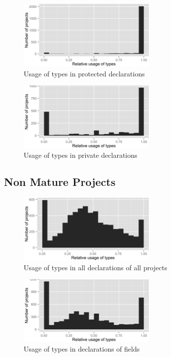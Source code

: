 \begin{figure}[h]
\centering 
\includegraphics[width=0.6\textwidth]{../aosd_2014/analysis/result/script/class/histograms/12_Protected.png} 
\caption{Usage of types in protected declarations}
\end{figure}

\begin{figure}[h]
\centering 
\includegraphics[width=0.6\textwidth]{../aosd_2014/analysis/result/script/class/histograms/11_Private.png} 
\caption{Usage of types in private declarations}
\end{figure}


\FloatBarrier
\subsection*{Non Mature Projects}

\begin{figure}[h]
\centering 
\includegraphics[width=0.6\textwidth]{../aosd_2014/analysis/result/script/class/histograms/5_all_types.png} 
\caption{Usage of types in all declarations of all projects}
\end{figure}

\begin{figure}[h]
\centering 
\includegraphics[width=0.6\textwidth]{../aosd_2014/analysis/result/script/class/histograms/10_Field.png} 
\caption{Usage of types in declarations of fields}
\end{figure}


